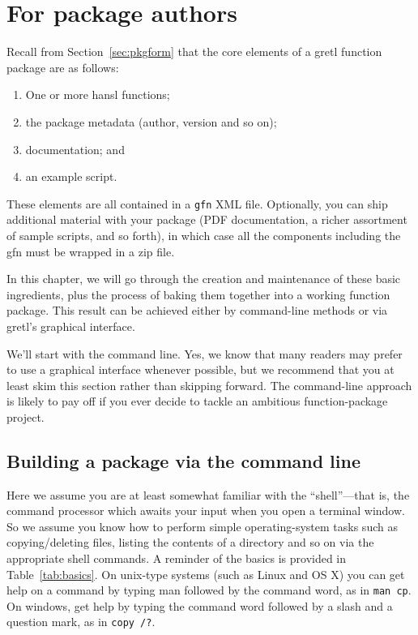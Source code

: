 \documentclass[oneside]{book}
\begin{document}

\chapter{For package authors}
\label{chap:authors}

Recall from Section~\ref{sec:pkgform} that the core elements
of a gretl function package are as follows:
\begin{enumerate}
\item One or more hansl functions;
\item the package metadata (author, version and so on);
\item documentation; and
\item an example script.
\end{enumerate}
These elements are all contained in a \texttt{gfn} XML file.
Optionally, you can ship additional material with your package (PDF
documentation, a richer assortment of sample scripts, and so forth),
in which case all the components including the \textsf{gfn} must be
wrapped in a zip file.

In this chapter, we will go through the creation and maintenance of
these basic ingredients, plus the process of baking them together into
a working function package. This result can be achieved either by
command-line methods or via gretl's graphical interface.

We'll start with the command line. Yes, we know that many readers may
prefer to use a graphical interface whenever possible, but we
recommend that you at least skim this section rather than skipping
forward.  The command-line approach is likely to pay off if you ever
decide to tackle an ambitious function-package project.


\section{Building a package via the command line}
\label{sec:cli-build}

Here we assume you are at least somewhat familiar with the
``shell''---that is, the command processor which awaits your input
when you open a terminal window. So we assume you know how to perform
simple operating-system tasks such as copying/deleting files, listing
the contents of a directory and so on via the appropriate shell
commands. A reminder of the basics is provided in
Table~\ref{tab:basics}. On unix-type systems (such as Linux and OS X)
you can get help on a command by typing man followed by the command
word, as in \texttt{man cp}. On windows, get help by typing the
command word followed by a slash and a question mark, as in
\texttt{copy /?}.
\end{document}
